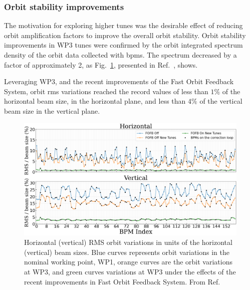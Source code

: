 \subsubsection{Orbit stability improvements}
The motivation for exploring higher tunes was the desirable effect of reducing orbit amplification factors to improve the overall orbit stability. Orbit stability improvements in \gls*{WP3} tunes were confirmed by the orbit integrated spectrum density of the orbit data collected with \glspl*{bpm}. The spectrum decreased by a factor of approximately 2, as Fig.~\ref{fig:integrated_spec}, presented in Ref.~\cite{liu_status_2023}, shows.

Leveraging \gls*{WP3}, and the recent improvements of the Fast Orbit Feedback System, orbit \gls*{rms} variations reached the record values of less than $1\%$ of the horizontal beam size, in the horizontal plane, and less than $4\%$ of the vertical beam size in the vertical plane.

\begin{figure}[htb]
    \centering
    \includegraphics[width=\textwidth]{Images/WEOGA2_f5.png}
    \caption[Horizontal (vertical) RMS orbit variations in units of the horizontal (vertical) beam sizes.]{Horizontal (vertical) RMS orbit variations in units of the horizontal (vertical) beam sizes. Blue curves represents orbit variations in the nominal working point, \gls*{WP1}, orange curves are the orbit variations at \gls*{WP3}, and green curves variations at \gls*{WP3} under the effects of the recent improvements in Fast Orbit Feedback System. From Ref.~\cite{liu_status_2023}}
    \label{fig:integrated_spec}
\end{figure}

